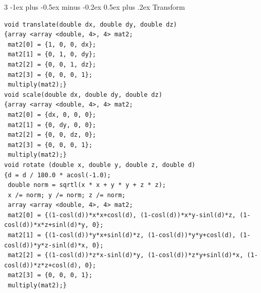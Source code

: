 \documentclass[8pt,a4paper,onesided]{article}
\makeatletter
\renewcommand{\subsection}{\@startsection{subsection}{2}{0mm}
    {-1ex plus -0.5ex minus -0.2ex} %
    {0.5ex plus .2ex}                %
    {\normalfont\large\bfseries}}    %
\makeatother
\begin{document}
\begin{multicols}{3}
\subsection{Transform}
\begin{verbatim}
void translate(double dx, double dy, double dz)
{array <array <double, 4>, 4> mat2;
 mat2[0] = {1, 0, 0, dx};
 mat2[1] = {0, 1, 0, dy};
 mat2[2] = {0, 0, 1, dz};
 mat2[3] = {0, 0, 0, 1};
 multiply(mat2);}
void scale(double dx, double dy, double dz)
{array <array <double, 4>, 4> mat2;
 mat2[0] = {dx, 0, 0, 0};
 mat2[1] = {0, dy, 0, 0};
 mat2[2] = {0, 0, dz, 0};
 mat2[3] = {0, 0, 0, 1};
 multiply(mat2);}
void rotate (double x, double y, double z, double d)
{d = d / 180.0 * acosl(-1.0);
 double norm = sqrtl(x * x + y * y + z * z);
 x /= norm; y /= norm; z /= norm;
 array <array <double, 4>, 4> mat2;
 mat2[0] = {(1-cosl(d))*x*x+cosl(d), (1-cosl(d))*x*y-sinl(d)*z, (1-cosl(d))*x*z+sinl(d)*y, 0};
 mat2[1] = {(1-cosl(d))*y*x+sinl(d)*z, (1-cosl(d))*y*y+cosl(d), (1-cosl(d))*y*z-sinl(d)*x, 0};
 mat2[2] = {(1-cosl(d))*z*x-sinl(d)*y, (1-cosl(d))*z*y+sinl(d)*x, (1-cosl(d))*z*z+cosl(d), 0};
 mat2[3] = {0, 0, 0, 1};
 multiply(mat2);}
\end{verbatim}

\end{multicols}
\end{document}
